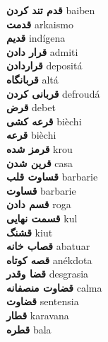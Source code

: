 \textbf{ قدم تند کردن  } baiben \\
\textbf{ قدمت  } arkaismo \\
\textbf{ قدیم  } indígena \\
\textbf{ قرار دادن  } admiti \\
\textbf{ قراردادن  } depositá \\
\textbf{ قربانگاه  } altá \\
\textbf{ قربانی کردن  } defroudá \\
\textbf{ قرض  } debet \\
\textbf{ قرعه کشی  } bièchi \\
\textbf{ قرعه  } bièchi \\
\textbf{ قرمز شده  } krou \\
\textbf{ قرین شدن  } casa \\
\textbf{ قساوت قلب  } barbarie \\
\textbf{ قساوت  } barbarie \\
\textbf{ قسم دادن  } roga \\
\textbf{ قسمت نهایی  } kul \\
\textbf{ قشنگ  } kiut \\
\textbf{ قصاب خانه  } abatuar \\
\textbf{ قصه کوتاه  } anékdota \\
\textbf{ قضا وقدر  } desgrasia \\
\textbf{ قضاوت منصفانه  } calma \\
\textbf{ قضاوت  } sentensia \\
\textbf{ قطار  } karavana \\
\textbf{ قطره  } bala \\
